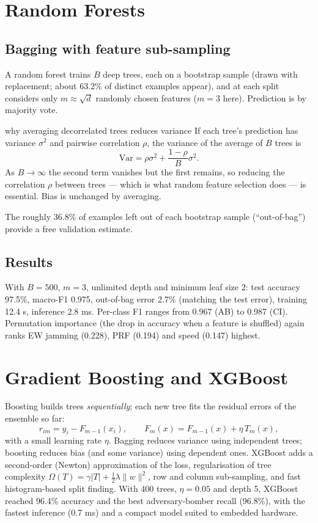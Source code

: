\documentclass[11pt]{article}
\begin{document}
\section{Random Forests}
\subsection{Bagging with feature sub-sampling}
A random forest trains $B$ deep trees, each on a bootstrap sample (drawn with replacement; about 63.2\% of distinct examples appear), and at each split considers only $m\approx\sqrt d$ randomly chosen features ($m=3$ here). Prediction is by majority vote.
\begin{derivation}{why averaging decorrelated trees reduces variance}
If each tree's prediction has variance $\sigma^2$ and pairwise correlation $\rho$, the variance of the average of $B$ trees is
\[\text{Var}=\rho\sigma^2+\frac{1-\rho}{B}\sigma^2.\]
As $B\to\infty$ the second term vanishes but the first remains, so reducing the correlation $\rho$ between trees --- which is what random feature selection does --- is essential. Bias is unchanged by averaging.
\end{derivation}
The roughly 36.8\% of examples left out of each bootstrap sample (``out-of-bag'') provide a free validation estimate.

\subsection{Results}
With $B=500$, $m=3$, unlimited depth and minimum leaf size 2: test accuracy 97.5\%, macro-F1 0.975, out-of-bag error 2.7\% (matching the test error), training 12.4 s, inference 2.8 ms. Per-class F1 ranges from 0.967 (AB) to 0.987 (CI). Permutation importance (the drop in accuracy when a feature is shuffled) again ranks EW jamming (0.228), PRF (0.194) and speed (0.147) highest.

\section{Gradient Boosting and XGBoost}
Boosting builds trees \emph{sequentially}; each new tree fits the residual errors of the ensemble so far:
\[r_{im}=y_i-F_{m-1}(x_i),\qquad F_m(x)=F_{m-1}(x)+\eta\,T_m(x),\]
with a small learning rate $\eta$. Bagging reduces variance using independent trees; boosting reduces bias (and some variance) using dependent ones. XGBoost adds a second-order (Newton) approximation of the loss, regularisation of tree complexity $\Omega(T)=\gamma|T|+\tfrac12\lambda\|w\|^2$, row and column sub-sampling, and fast histogram-based split finding. With 400 trees, $\eta=0.05$ and depth 5, XGBoost reached 96.4\% accuracy and the best adversary-bomber recall (96.8\%), with the fastest inference (0.7 ms) and a compact model suited to embedded hardware.
\end{document}
